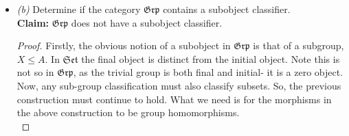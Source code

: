 \documentclass[12pt,letterpaper]{article}
\begin{document}
\begin{itemize}
\begin{proof}
		Further, this makes $X$ universal as if $W$ is such that\\
		\\\\
		commutes, then $\forall w\in W$ we have that $\chi_X(i_W(w)) = y = Y(*_W(w))$. But this can only be the case if $W\subset X$. Then, there is an inclusion $i_{WX} : W \rightarrow X$ such that\\
		\\\\
		commutes. This still preserves a bijective correspondence between subsets and morphisms from $A$ to $\Omega$, as $\chi_W = \chi_X \circ i_{W}$. \textcolor{red}{So $X$ is \textbf{final} with respect to making this diagram commute}.
	\end{proof}
	\item\textit{(b)} Determine if the category $\mathfrak{Grp}$ contains a subobject classifier.\\
	\textbf{Claim:} $\mathfrak{Grp}$ does not have a subobject classifier.
	\begin{proof}
		Firstly, the obvious notion of a subobject in $\mathfrak{Grp}$ is that of a subgroup, $X\leq A$. In $\mathfrak{Set}$ the final object is distinct from the initial object. Note this is not so in $\mathfrak{Grp}$, as the trivial group is both final and initial- it is a zero object. Now, any sub-group classification must also classify subsets. So, the previous construction must continue to hold. What we need is for the morphisms in the above construction to be group homomorphisms.\\
\end{proof}
\end{itemize}
\end{document}
